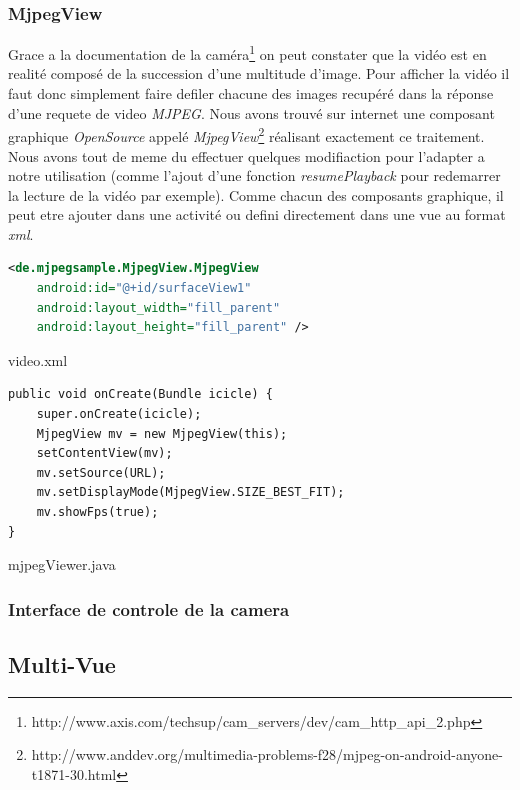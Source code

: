 \subsubsection{MjpegView}
Grace a la documentation de la caméra\footnote{\label{docAxis}
http://www.axis.com/techsup/cam\_servers/dev/cam\_http\_api\_2.php} on peut
constater que la vidéo est en realité composé de la succession d'une multitude
d'image. Pour afficher la vidéo il faut donc simplement faire defiler chacune
des images recupéré dans la réponse d'une requete de video \textit{MJPEG}.
\newline
Nous avons trouvé sur internet une composant graphique \textit{OpenSource}
appelé \textit{MjpegView}\footnote{\label{MjpegView}
http://www.anddev.org/multimedia-problems-f28/mjpeg-on-android-anyone-t1871-30.html}
réalisant exactement ce traitement.
Nous avons tout de meme du effectuer quelques modifiaction pour l'adapter a
notre utilisation (comme l'ajout d'une fonction \textit{resumePlayback} pour
redemarrer la lecture de la vidéo par exemple).\newline
Comme chacun des composants graphique, il peut etre ajouter dans une activité ou
defini directement dans une vue au format \textit{xml}.\newline
\begin{center}
\begin{lstlisting}[language=XML]
<de.mjpegsample.MjpegView.MjpegView
	android:id="@+id/surfaceView1"
	android:layout_width="fill_parent"
	android:layout_height="fill_parent" />
\end{lstlisting}
 video.xml
\end{center}
\begin{center}
\begin{lstlisting}
public void onCreate(Bundle icicle) {
	super.onCreate(icicle);
	MjpegView mv = new MjpegView(this);
	setContentView(mv);
	mv.setSource(URL);
	mv.setDisplayMode(MjpegView.SIZE_BEST_FIT);
	mv.showFps(true);
}
\end{lstlisting}
mjpegViewer.java
\end{center}





\subsubsection{Interface de controle de la camera}

\subsection{Multi-Vue}
